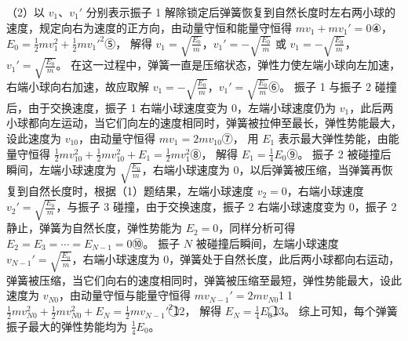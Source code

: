 \documentclass[\gkver]{gaokaozhenti}
\begin{document}
\begin{enumerate}
{（2）以 $v_{1}$、$v_{1}'$ 分别表示振子 1 解除锁定后弹簧恢复到自然长度时左右两小球的速度，规定向右为速度的正方向，由动量守恒和能量守恒得
$mv_{1}+mv_{1}'=0$④，
$E_{0}=\frac{1}{2}mv_{1}^{2}+\frac{1}{2}mv_{1}'^{2}$⑤，
解得 $v_{1}=\sqrt{\frac{E_{0}}{m}}$，$v_{1}'=-\sqrt{\frac{E_{0}}{m}}$ 或 $v_{1}=-\sqrt{\frac{E_{0}}{m}}$，$v_{1}'=\sqrt{\frac{E_{0}}{m}}$。
在这一过程中，弹簧一直是压缩状态，弹性力使左端小球向左加速，右端小球向右加速，故应取解 $v_{1}=-\sqrt{\frac{E_{0}}{m}}$，$v_{1}'=\sqrt{\frac{E_{0}}{m}}$⑥。
振子 1 与振子 2 碰撞后，由于交换速度，振子 1 右端小球速度变为 0，左端小球速度仍为 $v_{1}$，此后两小球都向左运动，当它们向左的速度相同时，弹簧被拉伸至最长，弹性势能最大，设此速度为 $v_{10}$，由动量守恒得 $mv_{1}=2mv_{10}$⑦，
用 $E_{1}$ 表示最大弹性势能，由能量守恒得 $\frac{1}{2}mv_{10}^{2}+\frac{1}{2}mv_{10}^{2}+E_{1}=\frac{1}{2}mv_{1}^{2}$⑧，
解得 $E_{1}=\frac{1}{4}E_{0}$⑨。
振子 2 被碰撞后瞬间，左端小球速度为 $\sqrt{\frac{E_{0}}{m}}$，右端小球速度为 0，以后弹簧被压缩，当弹簧再恢复到自然长度时，根据（1）题结果，左端小球速度 $v_{2}=0$，右端小球速度 $v_{2}'=\sqrt{\frac{E_{0}}{m}}$，与振子 3 碰撞，由于交换速度，振子 2 右端小球速度变为 0，振子 2 静止，弹簧为自然长度，弹性势能为 $E_{2}=0$，同样分析可得 $E_{2}=E_{3}=\cdots=E_{N-1}=0$⑩。
振子 $N$ 被碰撞后瞬间，左端小球速度 $v_{N-1}'=\sqrt{\frac{E_{0}}{m}}$，右端小球速度为 0，弹簧处于自然长度，此后两小球都向右运动，弹簧被压缩，当它们向右的速度相同时，弹簧被压缩至最短，弹性势能最大，设此速度为 $v_{N0}$，由动量守恒与能量守恒得 $mv_{N-1}'=2mv_{N0}$\textcircled{\scriptsize 11}，
$\frac{1}{2}mv_{N0}^{2}+\frac{1}{2}mv_{N0}^{2}+E_{N}=\frac{1}{2}mv_{N-1}'^{2}$\textcircled{\scriptsize 12}，
解得 $E_{N}=\frac{1}{4}E_{0}$\textcircled{\scriptsize 13}。
综上可知，每个弹簧振子最大的弹性势能均为 $\frac{1}{4}E_{0}$。
}

\end{enumerate}
\end{document}
